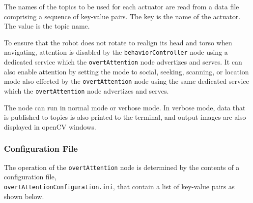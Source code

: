 \documentclass{CSSRforAfrica}
\begin{document}
{{The names of the topics to be used for each actuator are read from a data file comprising a sequence of key-value pairs. The key is the name of the actuator. The value is the topic name.   

To ensure that  the robot does not  rotate to realign its head and torso when navigating, attention is disabled by the {\small \verb+behaviorController+} node using a dedicated service which the {\small \verb+overtAttention+} node advertizes and serves. It can also enable attention by setting the mode to social, seeking, scanning, or location mode also effected by the {\small \verb+overtAttention+} node using the same dedicated service which the {\small \verb+overtAttention+} node advertizes and serves.

The node can run in normal mode or verbose mode. In verbose mode, data that is published to topics is also printed to the terminal, and output images are also displayed in openCV windows.



\subsubsection*{Configuration File}

The operation of the {\small \verb+overtAttention+} node is determined by the contents of a configuration file,\\ {\small \verb+overtAttentionConfiguration.ini+}, that  contain a list of key-value pairs as shown below.  


}}
\end{document}
